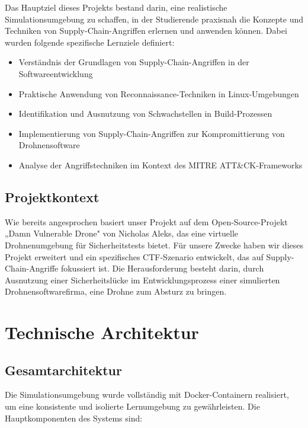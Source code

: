 \documentclass[12pt]{scrartcl}
\begin{document}
    Das Hauptziel dieses Projekts bestand darin, eine realistische Simulationsumgebung zu schaffen, in der Studierende praxisnah die Konzepte und Techniken von Supply-Chain-Angriffen erlernen und anwenden können. Dabei wurden folgende spezifische Lernziele definiert:
    
    \begin{itemize}
        \item Verständnis der Grundlagen von Supply-Chain-Angriffen in der Softwareentwicklung
        \item Praktische Anwendung von Reconnaissance-Techniken in Linux-Umgebungen
        \item Identifikation und Ausnutzung von Schwachstellen in Build-Prozessen
        \item Implementierung von Supply-Chain-Angriffen zur Kompromittierung von Drohnensoftware
        \item Analyse der Angriffstechniken im Kontext des MITRE ATT\&CK-Frameworks
    \end{itemize}
    
    \subsection{Projektkontext}

    Wie bereits angesprochen basiert unser Projekt auf dem Open-Source-Projekt „Damn Vulnerable Drone" von Nicholas Aleks, das eine virtuelle Drohnenumgebung für Sicherheitstests bietet. Für unsere Zwecke haben wir dieses Projekt erweitert und ein spezifisches CTF-Szenario entwickelt, das auf Supply-Chain-Angriffe fokussiert ist. Die Herausforderung besteht darin, durch Ausnutzung einer Sicherheitslücke im Entwicklungsprozess einer simulierten Drohnensoftwarefirma, eine Drohne zum Absturz zu bringen.

    \section{Technische Architektur}
    
    \subsection{Gesamtarchitektur}
    
    Die Simulationsumgebung wurde vollständig mit Docker-Containern realisiert, um eine konsistente und isolierte Lernumgebung zu gewährleisten. Die Hauptkomponenten des Systems sind:
    
\end{document}

